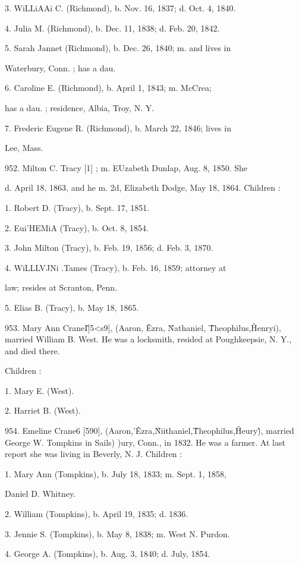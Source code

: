 3. WiLLiAAi C. (Richmond), b. Nov. 16, 1837; d. Oct. 4, 1840. 

4. Julia M. (Richmond), b. Dec. 11, 1838; d. Feb. 20, 1842. 

5. Sarah Jannet (Richmond), b. Dec. 26, 1840; m. and lives in 

Waterbury, Conn. ; has a dau. 

6. Caroline E. (Richmond), b. April 1, 1843; m. McCrea; 

has a dau. ; residence, Albia, Troy, N. Y. 

7. Frederic Eugene R. (Richmond), b. March 22, 1846; lives in 

Lee, Mass. 

952. Milton C. Tracy [1] ; m. EUzabeth Dunlap, Aug. 8, 1850. She 

d. April 18, 1863, and he m. 2d, Elizabeth Dodge, May 18, 
1864. Children : 

1. Robert D. (Tracy), b. Sept. 17, 1851. 

2. Eui'HEMiA (Tracy), b. Oct. 8, 1854. 

3. John Milton (Tracy), b. Feb. 19, 1856; d. Feb. 3, 1870. 

4. WiLLLVJNi .Tames (Tracy), b. Feb. 16, 1859; attorney at 

law; resides at Scranton, Penn. 

5. Elias B. (Tracy), b. May 18, 1865. 

953. Mary Ann CraneI\^ [5<s9], (Aaron, \^ Ezra, \^ Nathaniel, \^ 
Theophilus,\^ Henryi), married William B. West. He was a 
locksmith, resided at Poughkeepsie, N. Y., and died there. 

Children : 

1. Mary E. (West). 

2. Harriet B. (West). 

954. Emeline Crane6 [590], (Aaron,'\^ Ezra,\^ Niithaniel,\^ 
Theophilus,\^ Heury\^), married George W. Tompkins in Sails) )ury, 
Conn., in 1832. He was a farmer. At last report she was living 
in Beverly, N. J. Children : 

1. Mary Ann (Tompkins), b. July 18, 1833; m. Sept. 1, 1858, 

Daniel D. Whitney. 

2. William (Tompkins), b. April 19, 1835; d. 1836. 

3. Jennie S. (Tompkins), b. May 8, 1838; m. West N. Purdon. 

4. George A. (Tompkins), b. Aug. 3, 1840; d. July, 1854. 



